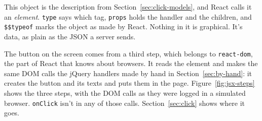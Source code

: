 This object is the description from Section~\ref{sec:click-models}, and React
calls it an \emph{element}. \texttt{type} says which tag, \texttt{props} holds
the handler and the children, and \texttt{\$\$typeof} marks the object as made
by React. Nothing in it is graphical. It's data, as plain as the JSON a server
sends.

The button on the screen comes from a third step, which belongs to
\texttt{react-dom}, the part of React that knows about browsers. It reads the
element and makes the same DOM calls the jQuery handlers made by hand in
Section~\ref{sec:by-hand}: it creates the button and its texts and puts them in
the page. Figure~\ref{fig:jsx-steps} shows the three steps, with the DOM calls
as they were logged in a simulated browser. \texttt{onClick} isn't in any of
those calls. Section~\ref{sec:click} shows where it goes.

